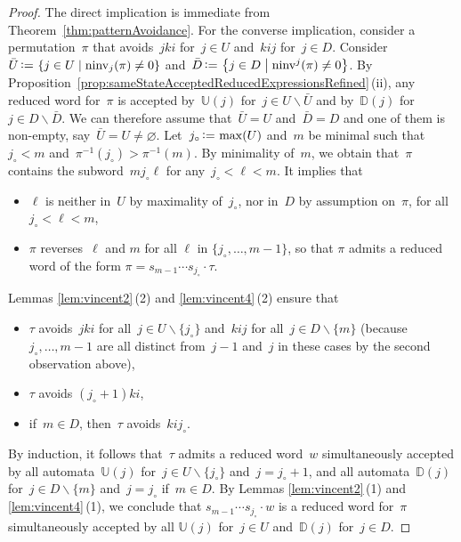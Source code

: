 \documentclass[11pt]{article}
\theoremstyle{definition}
\numberwithin{equation}{section}
\newcommand{\set}[2]{\left\{ #1 \;\middle|\; #2 \right\}}
\newcommand{\ssm}{\smallsetminus}
\newcommand{\eqdef}{\mbox{\,\raisebox{0.2ex}{\scriptsize\ensuremath{\mathrm:}}\ensuremath{=}\,}}
\DeclareMathOperator{\ninv}{ninv}
\newcommand{\automatonU}{\mathbb{U}}
\newcommand{\automatonD}{\mathbb{D}}
\begin{document}
\begin{proof}
The direct implication is immediate from Theorem~\ref{thm:patternAvoidance}.
For the converse implication, consider a permutation~$\pi$ that avoids~$jki$ for~$j \in U$ and~$kij$ for~$j \in D$.
Consider $\bar U \eqdef \set{j \in U}{\ninv_j(\pi) \ne 0}$ and~$\bar D \eqdef \set{j \in D}{\ninv^j(\pi) \ne 0}$.
By Proposition~\ref{prop:sameStateAcceptedReducedExpressionsRefined}\,(ii), any reduced word for~$\pi$ is accepted by~$\automatonU(j)$ for~$j \in U \ssm \bar U$ and by~$\automatonD(j)$ for~$j \in D \ssm \bar D$.
We can therefore assume that~$\bar U = U$ and~$\bar D = D$ and one of them is non-empty, say~$\bar U = U \ne \varnothing$.
Let~$j_\circ \eqdef \max(U)$ and~$m$ be minimal such that~$j_\circ < m$ and~$\pi^{-1}(j_\circ) > \pi^{-1}(m)$.
By minimality of~$m$, we obtain that~$\pi$ contains the subword~$mj_\circ\ell$ for any~$j_\circ < \ell < m$.
It implies that
\begin{itemize}
\item $\ell$ is neither in~$U$ by maximality of~$j_\circ$, nor in~$D$ by assumption on~$\pi$, for all~$j_\circ < \ell < m$,
\item $\pi$ reverses~$\ell$ and $m$ for all $\ell$ in $\{j_\circ,\dots,m-1\}$, so that $\pi$ admits a reduced word of the form $\pi = s_{m-1} \cdots s_{j_\circ} \cdot \tau$.
\end{itemize}
Lemmas \ref{lem:vincent2}\,(2) and \ref{lem:vincent4}\,(2) ensure that
\begin{itemize}
\item $\tau$ avoids~$jki$ for all~$j \in U \ssm \{j_\circ\}$ and~$kij$ for all~$j \in D \ssm \{m\}$ (because~$j_\circ, \dots, m-1$ are all distinct from~$j-1$ and~$j$ in these cases by the second observation above),
\item $\tau$ avoids $(j_\circ+1)ki$,
\item if~$m \in D$, then~$\tau$ avoids~$kij_\circ$.
\end{itemize}
By induction, it follows that~$\tau$ admits a reduced word~$w$ simultaneously accepted by all automata~$\automatonU(j)$ for~$j \in U \ssm \{j_\circ\}$ and~$j = j_\circ + 1$, and all automata~$\automatonD(j)$ for~$j \in D \ssm \{m\}$ and~$j = j_\circ$ if~$m \in D$.
By Lemmas \ref{lem:vincent2}\,(1) and \ref{lem:vincent4}\,(1), we conclude that $s_{m-1} \cdots s_{j_\circ} \cdot w$ is a reduced word for~$\pi$ simultaneously accepted by all $\automatonU(j)$ for~$j \in U$ and~$\automatonD(j)$ for~$j \in D$.
\end{proof}
\end{document}
